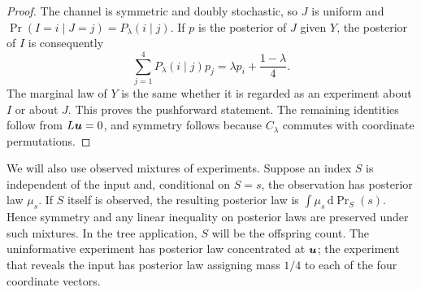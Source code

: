 \begin{proof}
The channel is symmetric and doubly stochastic, so $J$ is uniform and
$\Pr(I=i\mid J=j)=P_\lambda(i\mid j)$.  If $p$ is the posterior of
$J$ given $Y$, the posterior of $I$ is consequently
\[
  \sum_{j=1}^4P_\lambda(i\mid j)p_j
  =\lambda p_i+\frac{1-\lambda}{4}.
\]
The marginal law of $Y$ is the same whether it is regarded as an
experiment about $I$ or about $J$.  This proves the pushforward statement.
The remaining identities follow from $L\boldsymbol u=0$, and symmetry follows
because $C_\lambda$ commutes with coordinate permutations.
\end{proof}

We will also use observed mixtures of experiments.  Suppose an index $S$
is independent of the input and, conditional on $S=s$, the observation
has posterior law $\mu_s$.  If $S$ itself is observed, the resulting
posterior law is $\int\mu_s\,\mathrm d\Pr_S(s)$.  Hence symmetry and
any linear inequality on posterior laws are preserved under such
mixtures.  In the tree application, $S$ will be the offspring count.
The uninformative experiment has posterior law concentrated at $\boldsymbol u$;
the experiment that reveals the input has posterior law assigning mass
$1/4$ to each of the four coordinate vectors.
